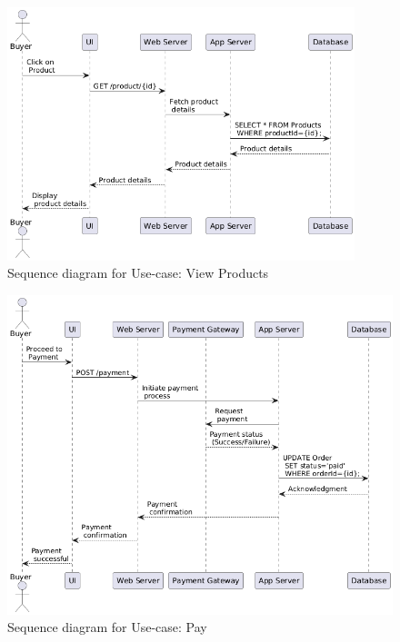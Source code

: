 \begin{figure}[!h]
	\centering
	\includegraphics[width=0.9\textwidth]{chapters/ch-04/301_usecase_view.png} %
	\caption{Sequence diagram for Use-case: View Products}
	\label{fig:seq_02} %
\end{figure}

\begin{figure}[!h]
	\centering
	\includegraphics[width=1\textwidth]{chapters/ch-04/302_usecase_pay.png} %
	\caption{Sequence diagram for Use-case: Pay}
	\label{fig:seq_03} %
\end{figure}

